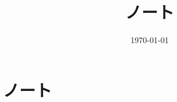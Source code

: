 \documentclass[6pt]{jreport}
\title{ノート}
\author{}
\date{\today}
\begin{document}
\maketitle
\tableofcontents

%
\chapter{ノート}

%
%
%
%
%
%
%
%



\end{document}
